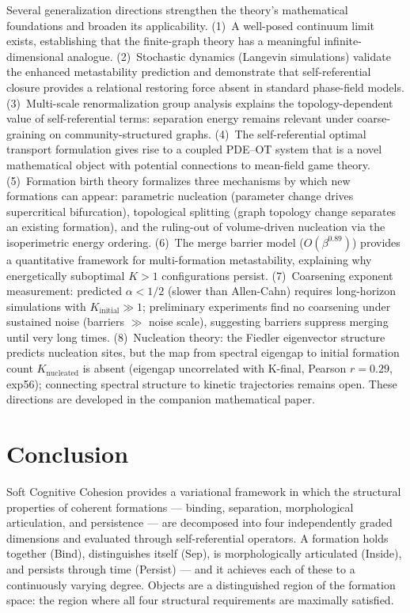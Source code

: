 \documentclass[lettersize,journal]{IEEEtran}
\begin{document}
Several generalization directions strengthen the theory's mathematical foundations and broaden its applicability. (1)~A well-posed continuum limit exists, establishing that the finite-graph theory has a meaningful infinite-dimensional analogue. (2)~Stochastic dynamics (Langevin simulations) validate the enhanced metastability prediction and demonstrate that self-referential closure provides a relational restoring force absent in standard phase-field models. (3)~Multi-scale renormalization group analysis explains the topology-dependent value of self-referential terms: separation energy remains relevant under coarse-graining on community-structured graphs. (4)~The self-referential optimal transport formulation gives rise to a coupled PDE--OT system that is a novel mathematical object with potential connections to mean-field game theory. (5)~Formation birth theory formalizes three mechanisms by which new formations can appear: parametric nucleation (parameter change drives supercritical bifurcation), topological splitting (graph topology change separates an existing formation), and the ruling-out of volume-driven nucleation via the isoperimetric energy ordering. (6)~The merge barrier model ($O(\beta^{0.89})$) provides a quantitative framework for multi-formation metastability, explaining why energetically suboptimal $K > 1$ configurations persist. (7)~Coarsening exponent measurement: predicted $\alpha < 1/2$ (slower than Allen-Cahn) requires long-horizon simulations with $K_{\mathrm{initial}} \gg 1$; preliminary experiments find no coarsening under sustained noise (barriers $\gg$ noise scale), suggesting barriers suppress merging until very long times. (8)~Nucleation theory: the Fiedler eigenvector structure predicts nucleation sites, but the map from spectral eigengap to initial formation count $K_{\mathrm{nucleated}}$ is absent (eigengap uncorrelated with K-final, Pearson $r = 0.29$, exp56); connecting spectral structure to kinetic trajectories remains open. These directions are developed in the companion mathematical paper.

\section{Conclusion}

Soft Cognitive Cohesion provides a variational framework in which the structural properties of coherent formations --- binding, separation, morphological articulation, and persistence --- are decomposed into four independently graded dimensions and evaluated through self-referential operators. A formation holds together (Bind), distinguishes itself (Sep), is morphologically articulated (Inside), and persists through time (Persist) --- and it achieves each of these to a continuously varying degree. Objects are a distinguished region of the formation space: the region where all four structural requirements are maximally satisfied.
\end{document}

